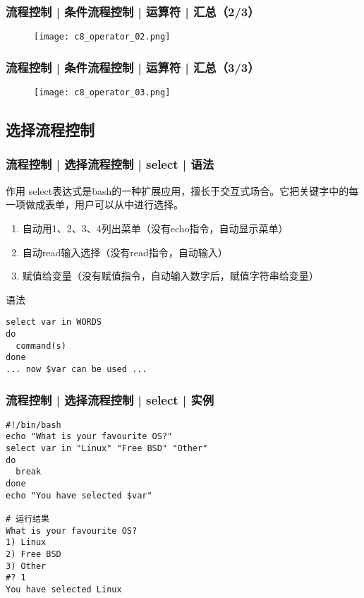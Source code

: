 \begin{frame}
  \frametitle{流程控制 | 条件流程控制 | 运算符 | 汇总（2/3）}
  \begin{figure}
    \centering
    \texttt{[image: c8\_operator\_02.png]}
  \end{figure}
\end{frame}

\begin{frame}
  \frametitle{流程控制 | 条件流程控制 | 运算符 | 汇总（3/3）}
  \begin{figure}
    \centering
    \texttt{[image: c8\_operator\_03.png]}
  \end{figure}
\end{frame}

\subsection{选择流程控制}
\begin{frame}[fragile]
  \frametitle{流程控制 | 选择流程控制 | select | \alert{语法}}
  \begin{block}{作用}
    select表达式是bash的一种扩展应用，擅长于交互式场合。它把关键字中的每一项做成表单，用户可以从中进行选择。
    \begin{enumerate}
      \item 自动用1、2、3、4列出菜单（没有echo指令，自动显示菜单）
      \item 自动read输入选择（没有read指令，自动输入）
      \item 赋值给变量（没有赋值指令，自动输入数字后，赋值字符串给变量）
    \end{enumerate}
  \end{block}
  \pause
  \begin{block}{语法}
\begin{lstlisting}
select var in WORDS
do
  command(s)
done
... now $var can be used ...
\end{lstlisting}
  \end{block}
\end{frame}

\begin{frame}[fragile]
  \frametitle{流程控制 | 选择流程控制 | select | \alert{实例}}
\begin{lstlisting}
#!/bin/bash
echo "What is your favourite OS?"
select var in "Linux" "Free BSD" "Other"
do
  break
done
echo "You have selected $var"

# 运行结果
What is your favourite OS?
1) Linux
2) Free BSD
3) Other
#? 1
You have selected Linux
\end{lstlisting}
\end{frame}

